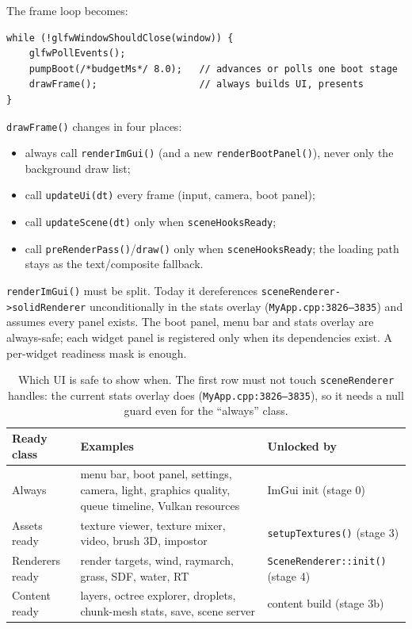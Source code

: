 \documentclass[11pt,a4paper]{article}
\begin{document}
The frame loop becomes:

\begin{lstlisting}
while (!glfwWindowShouldClose(window)) {
    glfwPollEvents();
    pumpBoot(/*budgetMs*/ 8.0);   // advances or polls one boot stage
    drawFrame();                  // always builds UI, presents
}
\end{lstlisting}

\texttt{drawFrame()} changes in four places:

\begin{itemize}[leftmargin=1.4em,itemsep=2pt]
\item always call \texttt{renderImGui()} (and a new
\texttt{renderBootPanel()}), never only the background draw list;
\item call \texttt{updateUi(dt)} every frame (input, camera, boot panel);
\item call \texttt{updateScene(dt)} only when \texttt{sceneHooksReady};
\item call \texttt{preRenderPass()}/\texttt{draw()} only when
\texttt{sceneHooksReady}; the loading path stays as the text/composite
fallback.
\end{itemize}

\texttt{renderImGui()} must be split. Today it dereferences
\texttt{sceneRenderer->solidRenderer} unconditionally in the stats overlay
(\texttt{MyApp.cpp:3826--3835}) and assumes every panel exists. The boot
panel, menu bar and stats overlay are always-safe; each widget panel is
registered only when its dependencies exist. A per-widget readiness mask is
enough.

\begin{table}[h]
\centering
\footnotesize
\begin{tabular}{@{}L{3.4cm}L{5.6cm}L{5.2cm}@{}}
\toprule
\textbf{Ready class} & \textbf{Examples} & \textbf{Unlocked by} \\
\midrule
Always & menu bar, boot panel, settings, camera, light, graphics quality, queue timeline, Vulkan resources & ImGui init (stage 0) \\
Assets ready & texture viewer, texture mixer, video, brush 3D, impostor & \texttt{setupTextures()} (stage 3) \\
Renderers ready & render targets, wind, raymarch, grass, SDF, water, RT & \texttt{SceneRenderer::init()} (stage 4) \\
Content ready & layers, octree explorer, droplets, chunk-mesh stats, save, scene server & content build (stage 3b) \\
\bottomrule
\end{tabular}
\caption{Which UI is safe to show when. The first row must not touch
\texttt{sceneRenderer} handles: the current stats overlay does
(\texttt{MyApp.cpp:3826--3835}), so it needs a null guard even for the
``always'' class.}
\end{table}
\end{document}
